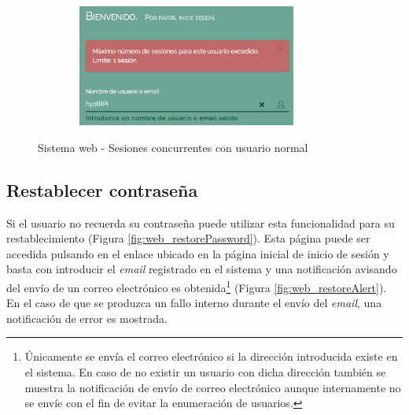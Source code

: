 \documentclass[12pt,a4paper, twoside]{report}
\begin{document}
		\begin{figure}[!ht]   
			\caption{Sistema web - Sesiones concurrentes con usuario normal} 
			\begin{center}
		 		\includegraphics[width=10cm, height=4cm]{Images/userGuide/web/concurrency} \\
				\label{fig:web_concurrency} 
			\end{center}  	
		\end{figure}
		
	\subsection{Restablecer contraseña}
	
	Si el usuario no recuerda su contraseña puede utilizar esta funcionalidad para su restablecimiento (Figura \ref{fig:web_restorePassword}). Esta página puede ser accedida pulsando en el enlace ubicado en la página inicial de inicio de sesión y basta con introducir el \textit{email} registrado en el sistema y una notificación avisando del envío de un correo electrónico es obtenida\footnote{Únicamente se envía el correo electrónico si la dirección introducida existe en el sistema. En caso de no existir un usuario con dicha dirección también se muestra la notificación de envío de correo electrónico aunque internamente no se envíe con el fin de evitar la enumeración de usuarios.} (Figura \ref{fig:web_restoreAlert}). En el caso de que se produzca un fallo interno durante el envío del \textit{email}, una notificación de error es mostrada.
	
		\newpage
	
\end{document}
